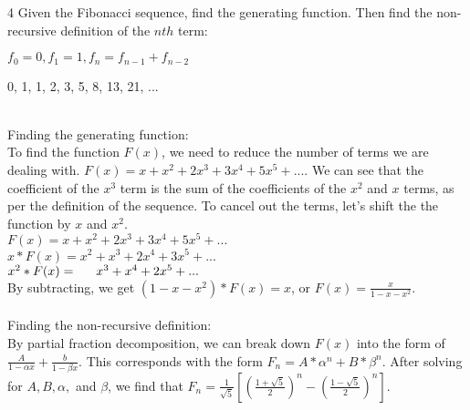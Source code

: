\documentclass[11pt,twosided]{article}
\begin{document}
\begin{problem}
4 Given the Fibonacci sequence, find the generating function. Then find the non-recursive definition of the $nth$ term: 
\begin{center} $f_{0}=0, f_{1}=1, f_{n}=f_{n-1}+f_{n-2}$ \end{center}
\begin{center} 0, 1, 1, 2, 3, 5, 8, 13, 21, ... \end{center}
\end{problem}

\begin{solution} \\
Finding the generating function: \\To find the function $F(x)$, we need to reduce the number of terms we are dealing with. $F(x) = x + x^2 + 2x^3 + 3x^4 + 5x^5 + ...$. We can see that the coefficient of the $x^3$ term is the sum of the coefficients of the $x^2$ and $x$ terms, as per the definition of the sequence. To cancel out the terms, let's shift the the function by ${x}$ and ${x^2}$.\\
$F(x) = x + x^2 + 2x^3 + 3x^4 + 5x^5 + ...$\\
$x * F(x) = x^2 + x^3 + 2x^4 + 3x^5 + ...$ \\
$x^2*F(x) = \indent   x^3 + x^4 + 2x^5 + ...$ \\
By subtracting, we get $(1-x-x^2)*F(x) = x$, or $F(x) = \frac{x}{1-x-x^2}$. \\ \\ 
Finding the non-recursive definition: \\By partial fraction decomposition, we can break down $F(x)$ into the form of $\frac{A}{1-\alpha x}+\frac{b}{1-\beta x}$. This corresponds with the form $F_{n}=A*\alpha ^n + B*\beta ^n$. After solving for $A, B, \alpha,$ and $\beta$, we find that $F_{n}=\frac{1}{\sqrt{5}}[(\frac{1+\sqrt{5}}{2})^{n} - (\frac{1-\sqrt{5}}{2})^{n}]$.
\end{solution}
\end{document}
